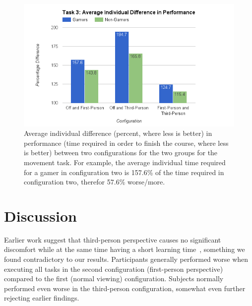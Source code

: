 \documentclass[runningheads,a4paper,oribibl]{llncs}
\begin{document}
\begin{figure}
   \centering
   \includegraphics[width=\textwidth]{ExternalMaterial/Task3GraphD}
   \caption{Average individual difference (percent, where less is better) in performance (time required in order to finish the course, where less is better) between two configurations for the two groups for the movement task. For example, the average individual time required for a gamer in configuration two is 157.6\% of the time required in configuration two, therefor 57.6\% worse/more.} \label{fig:Task3GraphD}
\end{figure}


















% 





\section{Discussion} \label{sec:Discussion}
Earlier work suggest that third-person perspective causes no significant discomfort while at the same time having a short learning time~\cite{nakamura20103pi}, something we found contradictory to our results. Participants generally performed worse when executing all tasks in the second configuration (first-person perspective) compared to the first (normal viewing) configuration. Subjects normally performed even worse in the third-person configuration, somewhat even further rejecting earlier findings. 
\end{document}
